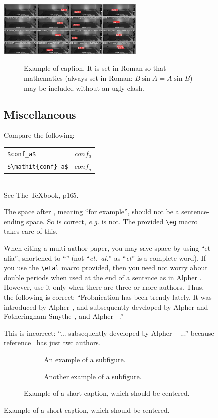 \documentclass[10pt,twocolumn,letterpaper]{article}
\begin{document}
\begin{figure}{
  \includegraphics[width=7cm]{validation.jpeg}
}
\begin{figure}[t]
  \centering
  \fbox{\rule{0pt}{2in} \rule{0.9\linewidth}{0pt}}

   \caption{Example of caption.
   It is set in Roman so that mathematics (always set in Roman: $B \sin A = A \sin B$) may be included without an ugly clash.}
   \label{fig:onecol}
\end{figure}

\subsection{Miscellaneous}

\noindent
Compare the following:\\
\begin{tabular}{ll}
 \verb'$conf_a$' &  $conf_a$ \\
 \verb'$\mathit{conf}_a$' & $\mathit{conf}_a$
\end{tabular}\\
See The \TeX book, p165.

The space after \eg, meaning ``for example'', should not be a sentence-ending space.
So \eg is correct, {\em e.g.} is not.
The provided \verb'\eg' macro takes care of this.

When citing a multi-author paper, you may save space by using ``et alia'', shortened to ``\etal'' (not ``{\em et.\ al.}'' as ``{\em et}'' is a complete word).
If you use the \verb'\etal' macro provided, then you need not worry about double periods when used at the end of a sentence as in Alpher \etal.
However, use it only when there are three or more authors.
Thus, the following is correct:
   ``Frobnication has been trendy lately.
   It was introduced by Alpher~\cite{Alpher02}, and subsequently developed by
   Alpher and Fotheringham-Smythe~\cite{Alpher03}, and Alpher \etal~\cite{Alpher04}.''

This is incorrect: ``... subsequently developed by Alpher \etal~\cite{Alpher03} ...'' because reference~\cite{Alpher03} has just two authors.




\begin{figure}
  \centering
  \begin{subfigure}{0.68\linewidth}
    \fbox{\rule{0pt}{2in} \rule{.9\linewidth}{0pt}}
    \caption{An example of a subfigure.}
    \label{fig:short-a}
  \end{subfigure}
  \hfill
  \begin{subfigure}{0.28\linewidth}
    \fbox{\rule{0pt}{2in} \rule{.9\linewidth}{0pt}}
    \caption{Another example of a subfigure.}
    \label{fig:short-b}
  \end{subfigure}
  \caption{Example of a short caption, which should be centered.}
  \label{fig:short}
\end{figure}


\end{figure}
\end{document}
